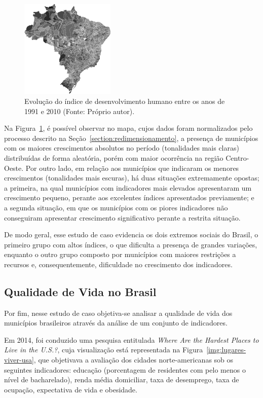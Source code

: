 \documentclass[conference]{IEEEtran}
\begin{document}
\begin{figure}[!ht]
\centering
\includegraphics[width=0.40\textwidth]{evolucao.png}
\caption{Evolução do índice de desenvolvimento humano entre os anos de 1991 e 2010 (Fonte: Próprio autor).}
\label{img:evolucao-idh}
\end{figure}

Na Figura~\ref{img:evolucao-idh}, é possível observar no mapa, cujos dados foram normalizados pelo processo descrito na Seção~\ref{section:redimensionamento}, a presença de municípios com os maiores crescimentos absolutos no período (tonalidades mais claras) distribuídas de forma aleatória, porém com maior ocorrência na região Centro-Oeste. Por outro lado, em relação aos municípios que indicaram os menores crescimentos (tonalidades mais escuras), há duas situações extremamente opostas; a primeira, na qual municípios com indicadores mais elevados apresentaram um crescimento pequeno, perante aos excelentes índices apresentados previamente; e a segunda situação, em que os municípios com os piores indicadores não conseguiram apresentar crescimento significativo perante a restrita situação.

De modo geral, esse estudo de caso evidencia os dois extremos sociais do Brasil, o primeiro grupo com altos índices, o que dificulta a presença de grandes variações, enquanto o outro grupo composto por municípios com maiores restrições a recursos e, consequentemente, dificuldade no crescimento dos indicadores. 

\subsection{Qualidade de Vida no Brasil}

Por fim, nesse estudo de caso objetiva-se analisar a qualidade de vida dos municípios brasileiros através da análise de um conjunto de indicadores. 

Em 2014, foi conduzido uma pesquisa entitulada \textit{Where Are the Hardest Places to Live in the U.S.?}, cuja visualização está representada na Figura~\ref{img:lugares-viver-usa}, que objetivava a avaliação dos cidades norte-americanas sob os seguintes indicadores: educação (porcentagem de residentes com pelo menos o nível de bacharelado), renda média domiciliar, taxa de desemprego, taxa de ocupação, expectativa de vida e obesidade.
\end{document}
